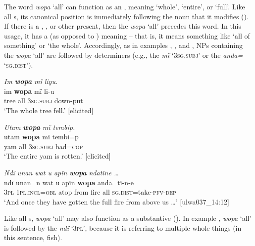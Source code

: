   The word \textit{wopa} ‘all’ can function as an , meaning ‘whole’, ‘entire’, or ‘full’. Like all s, its canonical position is immediately following the noun that it modifies (). If there is a , , or other  present, then the  \textit{wopa} ‘all’ precedes this word. In this usage, it has a  (as opposed to ) meaning -- that is, it means something like ‘all of something’ or ‘the whole’. Accordingly, as in examples , , and , NPs containing the  \textit{wopa} ‘all’ are followed by  determiners (e.g., the  \textit{mï} ‘3\textsc{sg.subj}’ or the   \textit{anda=} ‘\textsc{sg.dist’).}

\newpage

\ea%
    \label{ex:det:162}
          \textit{Im} \textbf{\textit{wopa}} \textit{mï liyu.}\\
\gll    im    \textbf{wopa}  mï      li-u\\
    tree  all    \textsc{3sg.subj}  down-put\\
\glt `The whole tree fell.’ [elicited]
\z

\ea%
    \label{ex:det:163}
          \textit{Utam} \textbf{\textit{wopa}} \textit{mï tembip.}\\
\gll    utam  \textbf{wopa}  mï      tembi=p\\
    yam  all    \textsc{3sg.subj}  bad=\textsc{cop}\\
\glt `The entire yam is rotten.’ [elicited]
\z

\ea%
    \label{ex:det:164}
          \textit{Ndï unan wat u apïn} \textbf{\textit{wopa}} \textit{ndatïne …}\\
\gll    ndï  unan=n    wat    u    apïn  \textbf{wopa} anda=tï-n-e\\
    3\textsc{pl}  1\textsc{pl.incl=obl}  atop  from  fire    all    \textsc{sg.dist}=take-\textsc{pfv-dep}\\
\glt `And once they have gotten the full fire from above us …’ [ulwa037\_14:12]
\z

Like all s, \textit{wopa} ‘all’ may also function as a substantive (). In example , \textit{wopa} ‘all’ is followed by the   \textit{ndï} `3\textsc{pl}’, because it is referring to multiple whole things (in this sentence, fish).

